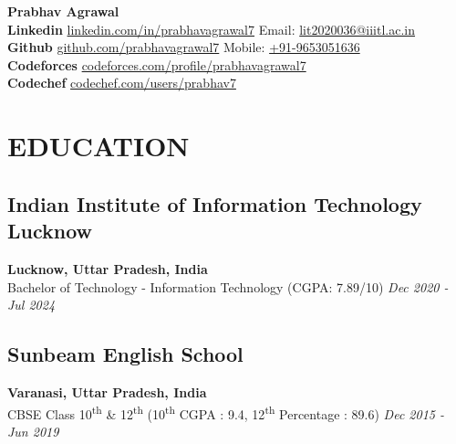 \documentclass[12pt]{article}
\begin{document}
{\LARGE\textbf{Prabhav Agrawal}} \\
\vspace*{5pt}
\small{\textbf{Linkedin} \hspace*{23pt} \href{https://linkedin.com/in/prabhavagrawal7}{linkedin.com/in/prabhavagrawal7} \hfill Email: \href{mailto:lit2020036@iiitl.ac.in}{lit2020036@iiitl.ac.in}\\
	\textbf{Github} \hspace*{31.5pt} \href{https://github.com/prabhavagrawal7}{github.com/prabhavagrawal7} \hfill Mobile: \href{tel:+919653051636}{+91-9653051636}\\
	\textbf{Codeforces} \hspace*{10pt} \href{https://codeforces.com/profile/prabhavagrawal7}{codeforces.com/profile/prabhavagrawal7}\\
	\textbf{Codechef} \hspace*{19pt} \href{https://codechef.com/users/prabhav7}{codechef.com/users/prabhav7}
}
\section*{EDUCATION}
\subsection*{Indian Institute of Information Technology Lucknow}	\hfill\textbf{Lucknow, Uttar Pradesh, India} \\
Bachelor of Technology - Information Technology (CGPA: 7.89/10) 	\hfill\textit{Dec 2020 -  Jul 2024} \\
\vspace{-5pt}
\subsection*{Sunbeam English School}	\hfill\textbf{Varanasi, Uttar Pradesh, India} \\
CBSE Class 10\textsuperscript{th} \& 12\textsuperscript{th} (10\textsuperscript{th} CGPA : 9.4, 12\textsuperscript{th} Percentage : 89.6) \hfill \textit{Dec 2015 - Jun 2019} \\
\end{document}
